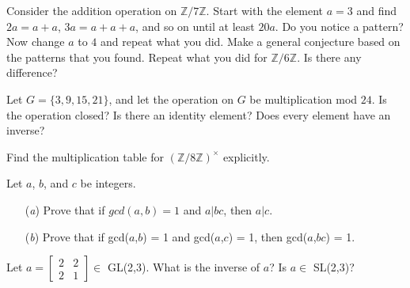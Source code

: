 \documentclass[12pt,letterpaper,boxed]{hmcpset}
\newcommand\blankpage{%
    \null
    \thispagestyle{empty}%
    \addtocounter{page}{-1}%
    \newpage}
\begin{document}

\afterpage{\blankpage}
\begin{problem}[1.3.2]
Consider the addition operation on $ \mathbb{Z}/7\mathbb{Z}$. Start with the element $ a = 3 $ and find $ 2a = a + a $, $ 3a = a + a + a $, and so on until at least $ 20a $. Do you notice a pattern? Now change $ a $ to $ 4 $ and repeat what you did. Make a general conjecture based on the patterns that you found. Repeat what you did for $ \mathbb{Z}/6\mathbb{Z} $. Is there any difference? 
\end{problem}

\begin{solution}

\end{solution}

\clearpage

\begin{problem}[1.3.6]
Let $ G = \{3,9,15,21\} $, and let the operation on $ G $ be multiplication mod $ 24 $. Is the operation closed? Is there an identity element? Does every element have an inverse? 
\end{problem}

\begin{solution}
\end{solution}

\clearpage

\begin{problem}[1.3.9]
Find the multiplication table for $ (\mathbb{Z}/8\mathbb{Z})^\times $ explicitly. 
\end{problem}

\begin{solution}
\end{solution}

\clearpage


\begin{problem}[1.3.13]
Let $ a $, $ b $, and $ c $ be integers. 
\begin{itemize}
  \item[(\textit{a})] Prove that if $ gcd(a,b) = 1 $ and $ a \vert bc $, then $ a \vert c $.
  
  \item[(\textit{b})] Prove that if gcd($a$,$b$) = 1 and gcd($a$,$c$) = 1, then gcd($a$,$bc$) = 1. 
\end{itemize}
\end{problem}

\begin{solution}
\end{solution}

\clearpage

\begin{problem}[1.4.2]
Let $ a = \begin{bmatrix} 2 & 2 \\ 2 & 1 \end{bmatrix} \in $ GL(2,3). What is the inverse of $ a $? Is $ a \in $ SL(2,3)?
\end{problem}
\begin{solution}
\end{solution}
\end{document}
